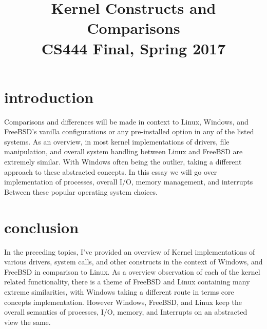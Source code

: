 \documentclass[letterpaper,10pt,titlepage]{IEEEtran}
\author{\name}
\title{Kernel Constructs and Comparisons\\
  	\large CS444 Final, Spring 2017}
\begin{document}
  \begin{titlepage}
      \maketitle
  \end{titlepage}
\tableofcontents
\listoffigures


\section{introduction}
Comparisons and differences will be made in context to Linux, Windows, and FreeBSD's vanilla configurations or any pre-installed option in any of the listed systems. As an overview, in most kernel implementations of drivers, file manipulation, and overall system handling between Linux and FreeBSD are extremely similar. With Windows often being the outlier, taking a different approach to these abstracted concepts. In this essay we will go over implementation of processes, overall I/O, memory management, and interrupts Between these popular operating system choices.









\section{conclusion}
In the preceding topics, I've provided an overview of Kernel implementations of various drivers, system calls, and other constructs in the context of Windows, and FreeBSD in comparison to Linux. As a overview observation of each of the kernel related functionality, there is a theme of FreeBSD and Linux containing many extreme similarities, with Windows taking a different route in terms core concepts implementation. However Windows, FreeBSD, and Linux keep the overall semantics of processes, I/O, memory, and Interrupts on an abstracted view the same.

\nocite{*}%


\end{document}
